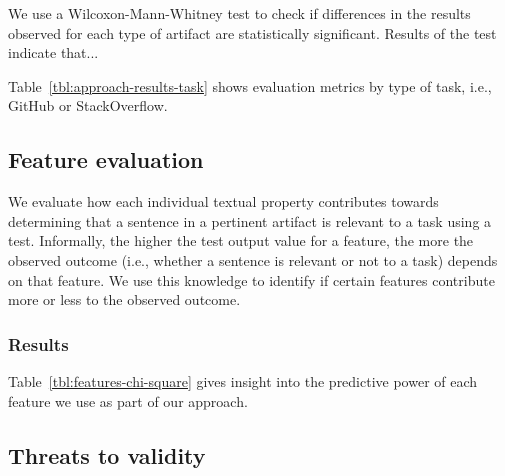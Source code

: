 We use a Wilcoxon-Mann-Whitney test to check if differences in the results observed for each 
type of artifact are statistically significant. Results of the test indicate that... 




Table~\ref{tbl:approach-results-task} shows evaluation metrics by type of task, i.e., GitHub or StackOverflow.





\subsection{Feature evaluation}


We evaluate how each individual textual property contributes towards determining 
that a sentence in a pertinent artifact is relevant to a task 
using a  test. 
Informally, the higher the test output value for a feature, the more the observed outcome (i.e., whether a sentence is relevant or not to a task) depends 
on that feature.
We use this knowledge to identify if certain features contribute more or less 
to the observed outcome.





\subsubsection{Results}



Table~\ref{tbl:features-chi-square} gives insight into the predictive power of each feature we use as part of our approach. 









\subsection{Threats to validity}


